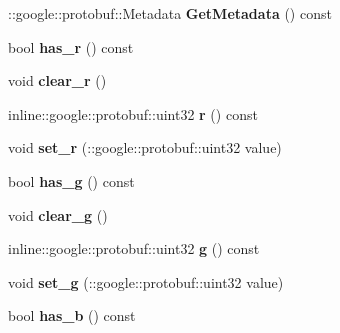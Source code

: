 \begin{DoxyCompactItemize}
\item 
\+::google\+::protobuf\+::\+Metadata {\bfseries Get\+Metadata} () const \hypertarget{classvss__state_1_1RGB_a72a71c6babca0d3cbd79caf9d8c9c9b2}{}\label{classvss__state_1_1RGB_a72a71c6babca0d3cbd79caf9d8c9c9b2}

\item 
bool {\bfseries has\+\_\+r} () const \hypertarget{classvss__state_1_1RGB_a44a2e2f01894715c2732c8455a27c158}{}\label{classvss__state_1_1RGB_a44a2e2f01894715c2732c8455a27c158}

\item 
void {\bfseries clear\+\_\+r} ()\hypertarget{classvss__state_1_1RGB_acf08083664a7f2da6c10b8faf4b25383}{}\label{classvss__state_1_1RGB_acf08083664a7f2da6c10b8faf4b25383}

\item 
inline\+::google\+::protobuf\+::uint32 {\bfseries r} () const \hypertarget{classvss__state_1_1RGB_ab1fb0a4d6eebeb673bc32c90b1b906ed}{}\label{classvss__state_1_1RGB_ab1fb0a4d6eebeb673bc32c90b1b906ed}

\item 
void {\bfseries set\+\_\+r} (\+::google\+::protobuf\+::uint32 value)\hypertarget{classvss__state_1_1RGB_a33dd755c711c8a7f5a1897e42ea4c711}{}\label{classvss__state_1_1RGB_a33dd755c711c8a7f5a1897e42ea4c711}

\item 
bool {\bfseries has\+\_\+g} () const \hypertarget{classvss__state_1_1RGB_a15f5bdc6f737b63ee48b030fb4348c3a}{}\label{classvss__state_1_1RGB_a15f5bdc6f737b63ee48b030fb4348c3a}

\item 
void {\bfseries clear\+\_\+g} ()\hypertarget{classvss__state_1_1RGB_acb92f198e1d2336c7f76a3aef3fb4cb2}{}\label{classvss__state_1_1RGB_acb92f198e1d2336c7f76a3aef3fb4cb2}

\item 
inline\+::google\+::protobuf\+::uint32 {\bfseries g} () const \hypertarget{classvss__state_1_1RGB_a36c2e8312984ac3b4577c6aae15878b2}{}\label{classvss__state_1_1RGB_a36c2e8312984ac3b4577c6aae15878b2}

\item 
void {\bfseries set\+\_\+g} (\+::google\+::protobuf\+::uint32 value)\hypertarget{classvss__state_1_1RGB_a353c8a4e1ff0d19c5a093b910797c7b9}{}\label{classvss__state_1_1RGB_a353c8a4e1ff0d19c5a093b910797c7b9}

\item 
bool {\bfseries has\+\_\+b} () const \hypertarget{classvss__state_1_1RGB_ad56ba40a1f62f12c828f60042dde4121}{}\label{classvss__state_1_1RGB_ad56ba40a1f62f12c828f60042dde4121}


\end{DoxyCompactItemize}

